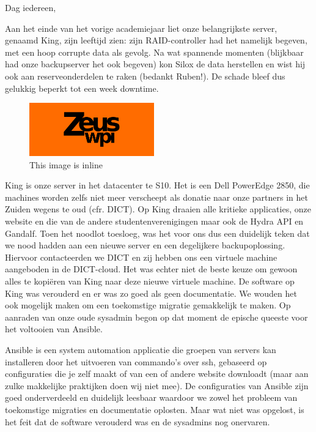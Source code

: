 \documentclass{article}
\begin{document}
Dag iedereen,

Aan het einde van het vorige academiejaar liet onze belangrijkste server, genaamd King, zijn leeftijd zien: zijn RAID-controller had het namelijk begeven, met een hoop corrupte data als gevolg.
Na wat spannende momenten (blijkbaar had onze backupserver het ook begeven) kon Silox de data herstellen en wist hij ook aan reserveonderdelen te raken (bedankt Ruben!).
De schade bleef dus gelukkig beperkt tot een week downtime.

\begin{figure}
  \begin{center}
    \includegraphics[width=0.48\textwidth]{image1.png}
  \end{center}
  \caption{This image is inline}
\end{figure}
King is onze server in het datacenter te S10.
Het is een Dell PowerEdge 2850, die machines worden zelfs niet meer verscheept als donatie naar onze partners in het Zuiden wegens te oud (cfr. DICT).
Op King draaien alle kritieke applicaties, onze website en die van de andere studentenverenigingen maar ook de Hydra API en Gandalf. Toen het noodlot toesloeg, was het voor ons dus een duidelijk teken dat we nood hadden aan een nieuwe server en een degelijkere backupoplossing.
Hiervoor contacteerden we DICT en zij hebben ons een virtuele machine aangeboden in de DICT-cloud.
Het was echter niet de beste keuze om gewoon alles te kopiëren van King naar deze nieuwe virtuele machine.
De software op King was verouderd en er was zo goed als geen documentatie.
We wouden het ook mogelijk maken om een toekomstige migratie gemakkelijk te maken.
Op aanraden van onze oude sysadmin begon op dat moment de epische queeste voor het voltooien van Ansible.

Ansible is een system automation applicatie die groepen van servers kan installeren door het uitvoeren van commando’s over ssh, gebaseerd op configuraties die je zelf maakt of van een of andere website downloadt (maar aan zulke makkelijke praktijken doen wij niet mee).
De configuraties van Ansible zijn goed onderverdeeld en duidelijk leesbaar waardoor we zowel het probleem van toekomstige migraties en documentatie oplosten. Maar wat niet was opgelost, is het feit dat de software verouderd was en de sysadmins nog onervaren.
\end{document}

